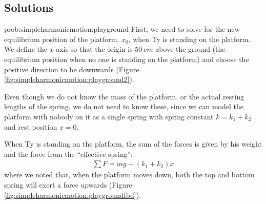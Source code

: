 \newpage
\subsection{Solutions}
\begin{solution}{prob:simpleharmonicmotion:playground}\label{soln:simpleharmonicmotion:playground}
First, we need to solve for the new equilibrium position of the platform, $x_0$, when Ty is standing on the platform. We define the $x$ axis so that the origin is $\SI{50}{cm}$ above the ground (the equilibrium position when no one is standing on the platform) and choose the positive direction to be downwards (Figure \ref{fig:simpleharmonicmotion:playground2}).

Even though we do not know the mass of the platform, or the actual resting lengths of the spring, we do not need to know these, since we can model the platform with nobody on it as a single spring with spring constant $k=k_1+k_2$ and rest position $x=0$.

When Ty is standing on the platform, the sum of the forces is given by his weight and the force from the ``effective spring'':
\begin{align*}
\sum F=mg-(k_1+k_2)x
\end{align*}
where we noted that, when the platform moves down, both the top and bottom spring will exert a force upwards (Figure \ref{fig:simpleharmonicmotion:playgroundfbd}). 


\end{solution}
